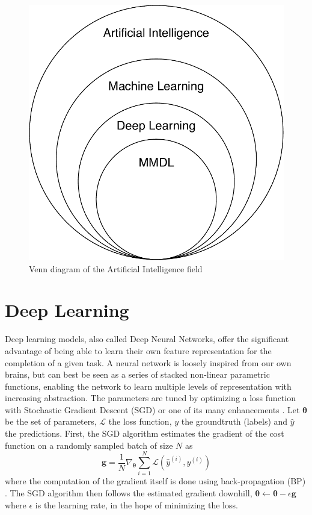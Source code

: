 \begin{figure}[!ht]
\centering
\includegraphics[scale=0.45]{figures/venn}
\caption{Venn diagram of the Artificial Intelligence field}	
\label{fig:venn-diagram}
\end{figure}


\section{Deep Learning}
Deep learning models, also called Deep Neural Networks, offer the significant advantage of being able to learn their own feature representation for the completion of a given task. A neural network is loosely inspired from our own brains, but can best be seen as a series of stacked non-linear parametric functions, enabling the network to learn multiple levels of representation with increasing abstraction. The parameters are tuned by optimizing a loss function with Stochastic Gradient Descent (SGD) or one of its many enhancements \citep{optim-algos}. Let $\bm{\theta}$ be the set of parameters, $\mathcal{L}$ the loss function, $y$ the groundtruth (labels) and $\hat{y}$ the predictions. First, the SGD algorithm estimates the gradient of the cost function on a randomly sampled batch of size $N$ as
\begin{equation}
\mathbf{g} = \frac{1}{N}\nabla_{\bm{\theta}}\sum_{i=1}^N\mathcal{L}(\hat{y}^{(i)},y^{(i)})
\end{equation}
where the computation of the gradient itself is done using back-propagation (BP) \citep{backprop}. The SGD algorithm then follows the estimated gradient downhill, $\bm{\theta} \leftarrow \bm{\theta} - \epsilon\mathbf{g}$ where $\epsilon$ is the learning rate, in the hope of minimizing the loss.

